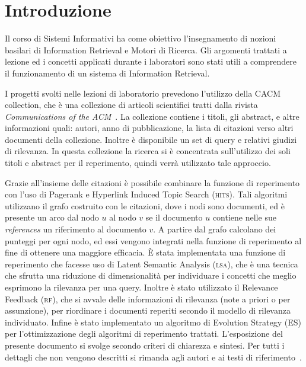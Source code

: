 \section{Introduzione}
\label{sec:introduzione}

Il corso di Sistemi Informativi ha come obiettivo l'insegnamento di nozioni basilari di Information Retrieval e Motori di Ricerca. Gli argomenti trattati a lezione ed i concetti applicati durante i laboratori sono stati utili a comprendere il funzionamento di un sistema di Information Retrieval.

I progetti svolti nelle lezioni di laboratorio prevedono l'utilizzo della CACM collection, che \`e una collezione di articoli scientifici tratti dalla rivista \textit{Communications of the ACM}~\cite{ACMCollection}. La collezione contiene i titoli, gli abstract, e altre informazioni quali: autori, anno di pubblicazione, la lista di citazioni verso altri documenti della collezione. Inoltre \`e disponibile un set di query e relativi giudizi di rilevanza. In questa collezione la ricerca si \`e concentrata sull'utilizzo dei soli titoli e abstract per il reperimento, quindi verr\`a utilizzato tale approccio. 

Grazie all'insieme delle citazioni \`e possibile combinare la funzione di reperimento con l'uso di Pagerank e Hyperlink Induced Topic Search (\textsc{hits}). Tali algoritmi utilizzano il grafo costruito con le citazioni, dove i nodi sono  documenti, ed \`e presente un arco dal nodo $u$ al nodo $v$ se il documento $u$ contiene nelle sue \textit{references} un riferimento al documento $v$. A partire dal grafo calcolano dei punteggi per ogni nodo, ed essi vengono integrati nella funzione di reperimento al fine di ottenere una maggiore efficacia. 
\`E stata implementata una funzione di reperimento che facesse uso di Latent Semantic Analysis (\textsc{lsa}), che \`e una tecnica che sfrutta una riduzione di dimensionalit\`a per individuare i concetti che meglio esprimono la rilevanza per una query. Inoltre \`e stato utilizzato il Relevance Feedback (\textsc{rf}), che si avvale delle informazioni di rilevanza (note a priori o per assunzione), per riordinare i documenti reperiti secondo il modello di rilevanza individuato.
Infine \`e stato implementato un algoritmo di Evolution Strategy (ES) per l'ottimizzazione degli algoritmi di reperimento trattati. L'esposizione del presente documento si svolge secondo criteri di chiarezza e sintesi. Per tutti i dettagli che non vengono descritti si rimanda agli autori e ai testi di riferimento~\cite{manning2008introduction,melucci2013information,croft2010search}.
